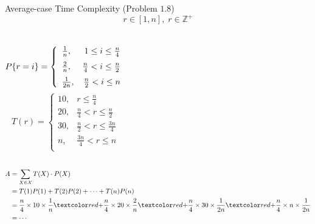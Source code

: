 \begin{frame}{}
  \begin{exampleblock}{Average-case Time Complexity (Problem $1.8$)}
    \[
      r \in [1,n], \; r \in \mathbb{Z}^{+}
    \]
    \vspace{-0.80cm}

    \begin{columns}
	\[
	  P\{r = i\} = \left\{\begin{array}{lr}
	    \frac{1}{n}, & 1 \le i \le \frac{n}{4} \\[6pt]
	    \frac{2}{n}, & \frac{n}{4} < i \le \frac{n}{2} \\[6pt]
	    \frac{1}{2n}, & \frac{n}{2} < i \le n
	  \end{array}\right.
	\]
	\[
	  T(r) = \left\{\begin{array}{lr}
	    10, & r \le \frac{n}{4} \\[6pt]
	    20, & \frac{n}{4} < r \le \frac{n}{2} \\[6pt]
	    30, & \frac{n}{2} < r \le \frac{3n}{4} \\[6pt]
	    n, & \frac{3n}{4} < r \le n \\[6pt]
	  \end{array}\right.
	\]
    \end{columns}
  \end{exampleblock}

  \pause
  \vspace{-0.30cm}
  \begin{align*}
    A &= \sum_{X \in \mathcal{X}} T(X) \cdot P(X) \\
      &= T(1) P(1) + T(2) P(2) + \cdots + T(n) P(n) \\
      &= \frac{n}{4} \times 10 \times \frac{1}{n} \red{+} \frac{n}{4} \times 20 \times \frac{2}{n} \red{+} 
	 \frac{n}{4} \times 30 \times \frac{1}{2n} \red{+} \frac{n}{4} \times n \times \frac{1}{2n} \\
      &= \cdots
  \end{align*}
\end{frame}

% 
% 

